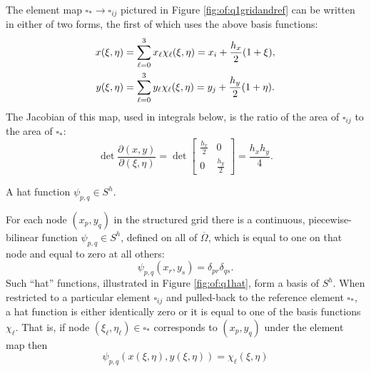 The element map $\square_\ast \to \square_{ij}$ pictured in Figure \ref{fig:of:q1gridandref} can be written in either of two forms, the first of which uses the above basis functions:
\begin{align}
x(\xi,\eta) &= \sum_{\ell=0}^3 x_\ell \chi_\ell(\xi,\eta) = x_i + \frac{h_x}{2} (1+\xi), \label{eq:of:referencemap} \\
y(\xi,\eta) &= \sum_{\ell=0}^3 y_\ell \chi_\ell(\xi,\eta) = y_j + \frac{h_y}{2} (1+\eta). \notag
\end{align}
The Jacobian of this map, used in integrals below, is the ratio of the area of $\square_{ij}$ to the area of $\square_\ast$:
\begin{equation}
\det\frac{\partial(x,y)}{\partial(\xi,\eta)} = \det\begin{bmatrix} \frac{h_x}{2} & 0 \\ 0 & \frac{h_y}{2} \end{bmatrix} = \frac{h_x h_y}{4}. \label{eq:of:elementjacobian}
\end{equation}

\begin{marginfigure}

\caption{A hat function $\psi_{p,q} \in S^h$.}
\label{fig:of:q1hat}
\end{marginfigure}

For each node $(x_p,y_q)$ in the structured grid there is a continuous, piecewise-bilinear function $\psi_{p,q} \in S^h$, defined on all of $\overline\Omega$, which is equal to one on that node and equal to zero at all others:
\begin{equation}
  \psi_{p,q}(x_r,y_s) = \delta_{pr} \delta_{qs}.  \label{eq:of:psinodewise}
\end{equation}
Such ``hat'' functions, illustrated in Figure \ref{fig:of:q1hat}, form a basis of $S^h$.  When restricted to a particular element $\square_{ij}$ and pulled-back to the reference element $\square_\ast$, a hat function is either identically zero or it is equal to one of the basis functions $\chi_\ell$.  That is, if node $(\xi_\ell,\eta_\ell) \in \square_\ast$ corresponds to $(x_p,y_q)$ under the element map then 
\begin{equation}
  \psi_{p,q}(x(\xi,\eta),y(\xi,\eta)) = \chi_\ell(\xi,\eta)  \label{eq:of:phionref}
\end{equation}

